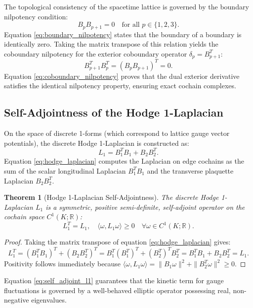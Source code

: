 \documentclass[11pt,reqno]{amsart}
\theoremstyle{plain}
\newtheorem{theorem}{Theorem}[section]
\theoremstyle{definition}
\theoremstyle{remark}
\numberwithin{equation}{section}
\begin{document}
The topological consistency of the spacetime lattice is governed by the boundary nilpotency condition:
\begin{equation}
\label{eq:boundary_nilpotency}
B_p B_{p+1} = 0 \quad \text{for all } p \in \{1, 2, 3\}.
\end{equation}
Equation \eqref{eq:boundary_nilpotency} states that the boundary of a boundary is identically zero. Taking the matrix transpose of this relation yields the coboundary nilpotency for the exterior coboundary operator $\delta_p = B_{p+1}^T$:
\begin{equation}
\label{eq:coboundary_nilpotency}
B_{p+1}^T B_p^T = (B_p B_{p+1})^T = 0.
\end{equation}
Equation \eqref{eq:coboundary_nilpotency} proves that the dual exterior derivative satisfies the identical nilpotency property, ensuring exact cochain complexes.

\subsection{Self-Adjointness of the Hodge 1-Laplacian}
On the space of discrete 1-forms (which correspond to lattice gauge vector potentials), the discrete Hodge 1-Laplacian is constructed as:
\begin{equation}
\label{eq:hodge_laplacian}
L_1 = B_1^T B_1 + B_2 B_2^T.
\end{equation}
Equation \eqref{eq:hodge_laplacian} computes the Laplacian on edge cochains as the sum of the scalar longitudinal Laplacian $B_1^T B_1$ and the transverse plaquette Laplacian $B_2 B_2^T$.

\begin{theorem}[Hodge 1-Laplacian Self-Adjointness]
The discrete Hodge 1-Laplacian $L_1$ is a symmetric, positive semi-definite, self-adjoint operator on the cochain space $C^1(K; \mathbb{R})$:
\begin{equation}
\label{eq:self_adjoint_l1}
L_1^T = L_1, \quad \langle \omega, L_1 \omega \rangle \ge 0 \quad \forall \omega \in C^1(K; \mathbb{R}).
\end{equation}
\end{theorem}
\begin{proof}
Taking the matrix transpose of equation \eqref{eq:hodge_laplacian} gives:
\begin{equation}
L_1^T = (B_1^T B_1)^T + (B_2 B_2^T)^T = B_1^T (B_1^T)^T + (B_2^T)^T B_2^T = B_1^T B_1 + B_2 B_2^T = L_1.
\end{equation}
Positivity follows immediately because $\langle \omega, L_1 \omega \rangle = \|B_1 \omega\|^2 + \|B_2^T \omega\|^2 \ge 0$.
\end{proof}
Equation \eqref{eq:self_adjoint_l1} guarantees that the kinetic term for gauge fluctuations is governed by a well-behaved elliptic operator possessing real, non-negative eigenvalues.
\end{document}
